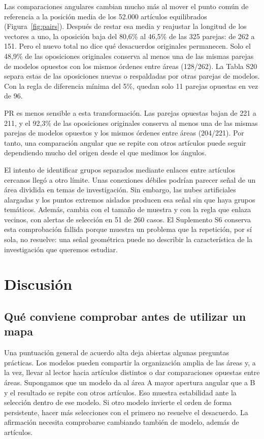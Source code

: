 \documentclass[12pt]{article}
\begin{document}
Las comparaciones angulares cambian mucho más al mover el punto común de referencia a la posición media de los 52.000 artículos equilibrados (Figura~\ref{fig:pairs}). Después de restar esa media y reajustar la longitud de los vectores a uno, la oposición baja del 80,6\% al 46,5\% de las 325 parejas: de 262 a 151. Pero el nuevo total no dice qué desacuerdos originales permanecen. Solo el 48,9\% de las oposiciones originales conserva al menos una de las mismas parejas de modelos opuestos con los mismos órdenes entre áreas (128/262). La Tabla S20 separa estas de las oposiciones nuevas o respaldadas por otras parejas de modelos. Con la regla de diferencia mínima del 5\%, quedan solo 11 parejas opuestas en vez de 96.

PR es menos sensible a esta transformación. Las parejas opuestas bajan de 221 a 211, y el 92,3\% de las oposiciones originales conserva al menos una de las mismas parejas de modelos opuestos y los mismos órdenes entre áreas (204/221). Por tanto, una comparación angular que se repite con otros artículos puede seguir dependiendo mucho del origen desde el que medimos los ángulos.

El intento de identificar grupos separados mediante enlaces entre artículos cercanos llegó a otro límite. Unas conexiones débiles podrían parecer señal de un área dividida en temas de investigación. Sin embargo, las nubes artificiales alargadas y los puntos extremos aislados producen esa señal sin que haya grupos temáticos. Además, cambia con el tamaño de muestra y con la regla que enlaza vecinos, con alertas de selección en 51 de 260 casos. El Suplemento S6 conserva esta comprobación fallida porque muestra un problema que la repetición, por sí sola, no resuelve: una señal geométrica puede no describir la característica de la investigación que queremos estudiar.

\FloatBarrier
\section{Discusión}
\subsection{Qué conviene comprobar antes de utilizar un mapa}
Una puntuación general de acuerdo alta deja abiertas algunas preguntas prácticas. Los modelos pueden compartir la organización amplia de las áreas y, a la vez, llevar al lector hacia artículos distintos o dar comparaciones opuestas entre áreas. Supongamos que un modelo da al área A mayor apertura angular que a B y el resultado se repite con otros artículos. Eso muestra estabilidad ante la selección dentro de ese modelo. Si otro modelo invierte el orden de forma persistente, hacer más selecciones con el primero no resuelve el desacuerdo. La afirmación necesita comprobarse cambiando también de modelo, además de artículos.
\end{document}
